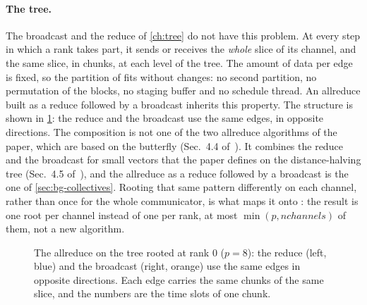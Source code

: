 \paragraph{The tree.}
The broadcast and the reduce of \cref{ch:tree} do not have this problem.
At every step in which a rank takes part, it sends or receives the \emph{whole} slice of its channel, and the same slice, in chunks, at each level of the tree.
The amount of data per edge is fixed, so the partition of \nccl{} fits without changes: no second partition, no permutation of the blocks, no staging buffer and no schedule thread.
An allreduce built as a reduce followed by a broadcast inherits this property.
The structure is shown in \cref{fig:tar-tree}: the reduce and the broadcast use the same edges, in opposite directions.
The composition is not one of the two allreduce algorithms of the \bine{} paper, which are based on the butterfly (Sec.~4.4 of~\cite{desensi2025bine}). It combines the reduce and the broadcast for small vectors that the paper defines on the distance-halving \bine{} tree (Sec.~4.5 of~\cite{desensi2025bine}), and the allreduce as a reduce followed by a broadcast is the one of \cref{sec:bg-collectives}.
Rooting that same pattern differently on each channel, rather than once for the whole communicator, is what maps it onto \nccl{}: the result is one root per channel instead of one per rank, at most $\min(p,\mathit{nchannels})$ of them, not a new algorithm.
\begin{figure}[t]
  \centering
  \hfill
  \caption{The allreduce on the \bine{} tree rooted at rank $0$ ($p=8$): the reduce
           (left, blue) and the broadcast (right, orange) use the same edges in opposite
           directions. Each edge carries the same chunks of the same slice, and the
           numbers are the time slots of one chunk.}
  \label{fig:tar-tree}
\end{figure}
